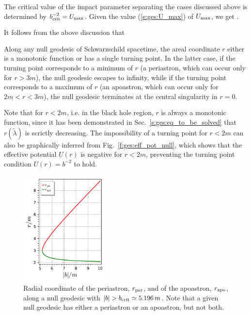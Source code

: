 The critical value of the impact parameter separating the cases discussed
above is determined by $b_{\rm crit}^{-2} = U_{\rm max}$.
Given the value (\ref{e:ges:U_max}) of $U_{\rm max}$, we get
\be \label{e:ges:b_crit}
    .
\ee

It follows from the above discussion that
\begin{greybox}
Along any null geodesic of Schwarzschild spacetime, the areal coordinate $r$
either is a monotonic function or has a single turning point. In the latter case,
if the turning point corresponds to a minimum of $r$ (a periastron, which can occur
only for $r>3m$), the null geodesic escapes to infinity, while if the turning
point corresponds to a maximum of $r$ (an apoastron, which can occur only for $2m<r<3m$), the
null geodesic terminates at the central singularity in $r=0$.
\end{greybox}
Note that for $r<2m$, i.e. in the black hole region, $r$
is always a monotonic function, since it has been demonstrated in
Sec.~\ref{s:ges:eq_to_be_solved} that $r(\tilde{\lambda})$ is scrictly
decreasing. The impossibility of a turning point for $r<2m$ can also be
graphically inferred from Fig.~\ref{f:ges:eff_pot_null}, which shows
that the effective potential $U(r)$ is negative for $r<2m$,
preventing the turning point condition $U(r) = b^{-2}$ to hold.

\begin{figure}
\centerline{\includegraphics[width=0.4\textwidth]{ges_null_per_apo.pdf}}
\caption[]{\label{f:ges:null_per_apo} \footnotesize
Radial coordinate of the periastron, $r_{\rm per}$, and of the apoastron,
$r_{\rm apo}$, along a null geodesic with $|b| > b_{\rm crit} \simeq 5.196\, m$.
Note that a given null geodesic has either a periastron or an apoastron, but not
both.}
\end{figure}


